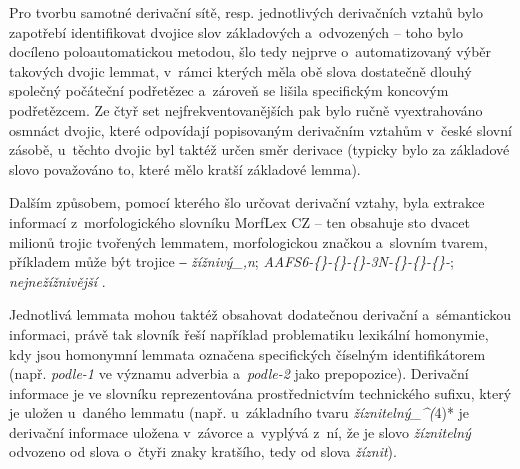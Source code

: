 Pro tvorbu samotné derivační sítě, resp. jednotlivých derivačních vztahů
bylo zapotřebí identifikovat dvojice slov základových a~odvozených --
toho bylo docíleno poloautomatickou metodou, šlo tedy nejprve
o~automatizovaný výběr takových dvojic lemmat, v~rámci kterých měla obě
slova dostatečně dlouhý společný počáteční podřetězec a~zároveň se
lišila specifickým koncovým podřetězcem. Ze čtyř set
nejfrekventovanějších pak bylo ručně vyextrahováno osmnáct dvojic, které
odpovídají popisovaným derivačním vztahům v~české slovní zásobě,
u~těchto dvojic byl taktéž určen směr derivace (typicky bylo za základové
slovo považováno to, které mělo kratší základové lemma).
\parencite{derinet-cz}

Dalším způsobem, pomocí kterého šlo určovat derivační vztahy, byla
extrakce informací z~morfologického slovníku MorfLex CZ -- ten obsahuje
sto dvacet milionů trojic tvořených lemmatem, morfologickou značkou
a~slovním tvarem, příkladem může být trojice ‒ \emph{žížnivý\_,n};
\emph{AAFS6-\{\}-\{\}-\{\}-3N-\{\}-\{\}-\{\}-}; \emph{nejnežížnivější}
\parencite{morflex}.

Jednotlivá lemmata mohou taktéž obsahovat dodatečnou derivační
a~sémantickou informaci, právě tak slovník řeší například problematiku
lexikální homonymie, kdy jsou homonymní lemmata označena specifických
číselným identifikátorem (např. \emph{podle-1} ve významu adverbia
a~\emph{podle-2} jako prepopozice). Derivační informace je ve slovníku
reprezentována prostřednictvím technického sufixu, který je uložen
u~daného lemmatu (např. u~základního tvaru \emph{žíznitelný\_\^{}(}4)* je
derivační informace uložena v~závorce a~vyplývá z~ní, že je slovo
\emph{žíznitelný} odvozeno od slova o~čtyři znaky kratšího, tedy od
slova \emph{žíznit}).~\parencite{sevcikova16}
